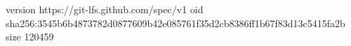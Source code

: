 version https://git-lfs.github.com/spec/v1
oid sha256:3545b6b4873782d0877609b42e085761f35d2cb8386ff1b67f83d13c5415fa2b
size 120459
